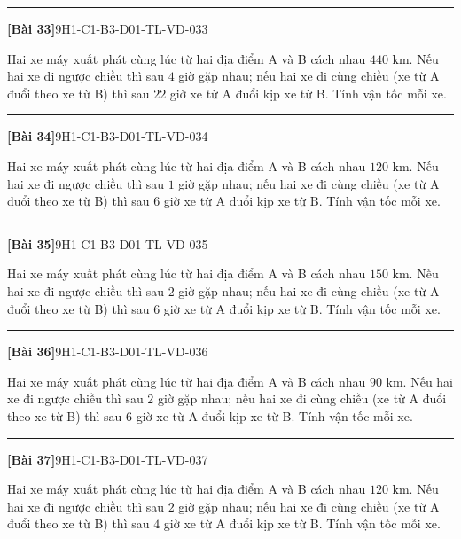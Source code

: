 \documentclass[12pt,a4paper]{article}
\newif\ifloigiai
\newenvironment{cauhoi}[2]{%
  \par\medskip\noindent\rule{\textwidth}{0.4pt}\par\nopagebreak
  \noindent\textbf{[#1]}\hfill{\scriptsize\ttfamily #2}\par\nopagebreak\smallskip}{\par}
\newcommand{\loigiai}[1]{\ifloigiai\par\smallskip\noindent\textit{Lời giải.} #1\par\fi}
\begin{document}
\begin{cauhoi}{Bài 33}{9H1-C1-B3-D01-TL-VD-033}
Hai xe máy xuất phát cùng lúc từ hai địa điểm A và B cách nhau $440$ km. Nếu hai xe đi ngược chiều thì sau $4$ giờ gặp nhau; nếu hai xe đi cùng chiều (xe từ A đuổi theo xe từ B) thì sau $22$ giờ xe từ A đuổi kịp xe từ B. Tính vận tốc mỗi xe.
\loigiai{Gọi vận tốc xe từ A là $x$ (km/h) và xe từ B là $y$ (km/h), $x>y>0$. Đi ngược chiều: $4(x+y)=440$, tức là $x+y=110$. Đi cùng chiều: $22(x-y)=440$, tức là $x-y=20$. Giải hệ ta được $x=65$, $y=45$ (thoả mãn). Vậy vận tốc xe từ A là 65 km/h, xe từ B là 45 km/h.}
\end{cauhoi}
\begin{cauhoi}{Bài 34}{9H1-C1-B3-D01-TL-VD-034}
Hai xe máy xuất phát cùng lúc từ hai địa điểm A và B cách nhau $120$ km. Nếu hai xe đi ngược chiều thì sau $1$ giờ gặp nhau; nếu hai xe đi cùng chiều (xe từ A đuổi theo xe từ B) thì sau $6$ giờ xe từ A đuổi kịp xe từ B. Tính vận tốc mỗi xe.
\loigiai{Gọi vận tốc xe từ A là $x$ (km/h) và xe từ B là $y$ (km/h), $x>y>0$. Đi ngược chiều: $(x+y)=120$, tức là $x+y=120$. Đi cùng chiều: $6(x-y)=120$, tức là $x-y=20$. Giải hệ ta được $x=70$, $y=50$ (thoả mãn). Vậy vận tốc xe từ A là 70 km/h, xe từ B là 50 km/h.}
\end{cauhoi}
\begin{cauhoi}{Bài 35}{9H1-C1-B3-D01-TL-VD-035}
Hai xe máy xuất phát cùng lúc từ hai địa điểm A và B cách nhau $150$ km. Nếu hai xe đi ngược chiều thì sau $2$ giờ gặp nhau; nếu hai xe đi cùng chiều (xe từ A đuổi theo xe từ B) thì sau $6$ giờ xe từ A đuổi kịp xe từ B. Tính vận tốc mỗi xe.
\loigiai{Gọi vận tốc xe từ A là $x$ (km/h) và xe từ B là $y$ (km/h), $x>y>0$. Đi ngược chiều: $2(x+y)=150$, tức là $x+y=75$. Đi cùng chiều: $6(x-y)=150$, tức là $x-y=25$. Giải hệ ta được $x=50$, $y=25$ (thoả mãn). Vậy vận tốc xe từ A là 50 km/h, xe từ B là 25 km/h.}
\end{cauhoi}
\begin{cauhoi}{Bài 36}{9H1-C1-B3-D01-TL-VD-036}
Hai xe máy xuất phát cùng lúc từ hai địa điểm A và B cách nhau $90$ km. Nếu hai xe đi ngược chiều thì sau $2$ giờ gặp nhau; nếu hai xe đi cùng chiều (xe từ A đuổi theo xe từ B) thì sau $6$ giờ xe từ A đuổi kịp xe từ B. Tính vận tốc mỗi xe.
\loigiai{Gọi vận tốc xe từ A là $x$ (km/h) và xe từ B là $y$ (km/h), $x>y>0$. Đi ngược chiều: $2(x+y)=90$, tức là $x+y=45$. Đi cùng chiều: $6(x-y)=90$, tức là $x-y=15$. Giải hệ ta được $x=30$, $y=15$ (thoả mãn). Vậy vận tốc xe từ A là 30 km/h, xe từ B là 15 km/h.}
\end{cauhoi}
\begin{cauhoi}{Bài 37}{9H1-C1-B3-D01-TL-VD-037}
Hai xe máy xuất phát cùng lúc từ hai địa điểm A và B cách nhau $120$ km. Nếu hai xe đi ngược chiều thì sau $2$ giờ gặp nhau; nếu hai xe đi cùng chiều (xe từ A đuổi theo xe từ B) thì sau $4$ giờ xe từ A đuổi kịp xe từ B. Tính vận tốc mỗi xe.
\loigiai{Gọi vận tốc xe từ A là $x$ (km/h) và xe từ B là $y$ (km/h), $x>y>0$. Đi ngược chiều: $2(x+y)=120$, tức là $x+y=60$. Đi cùng chiều: $4(x-y)=120$, tức là $x-y=30$. Giải hệ ta được $x=45$, $y=15$ (thoả mãn). Vậy vận tốc xe từ A là 45 km/h, xe từ B là 15 km/h.}
\end{cauhoi}
\end{document}

